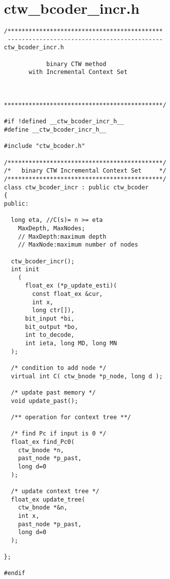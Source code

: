 \section{ctw\_bcoder\_incr.h}
\begin{verbatim}
/********************************************
 --------------------------------------------
ctw_bcoder_incr.h

            binary CTW method
       with Incremental Context Set



*********************************************/

#if !defined __ctw_bcoder_incr_h__
#define __ctw_bcoder_incr_h__

#include "ctw_bcoder.h"

/********************************************/
/*   binary CTW Incremental Context Set     */
/********************************************/
class ctw_bcoder_incr : public ctw_bcoder
{
public:

  long eta, //C(s)= n >= eta
    MaxDepth, MaxNodes;
    // MaxDepth:maximum depth
    // MaxNode:maximum number of nodes

  ctw_bcoder_incr();
  int init
    (
      float_ex (*p_update_esti)(
        const float_ex &cur,
        int x,
        long ctr[]),
      bit_input *bi,
      bit_output *bo,
      int to_decode,
      int ieta, long MD, long MN
  );

  /* condition to add node */
  virtual int C( ctw_bnode *p_node, long d );

  /* update past memory */
  void update_past();

  /** operation for context tree **/

  /* find Pc if input is 0 */
  float_ex find_Pc0(
    ctw_bnode *n,
    past_node *p_past,
    long d=0
  );

  /* update context tree */
  float_ex update_tree(
    ctw_bnode *&n,
    int x,
    past_node *p_past,
    long d=0
  );

};

#endif
\end{verbatim}
